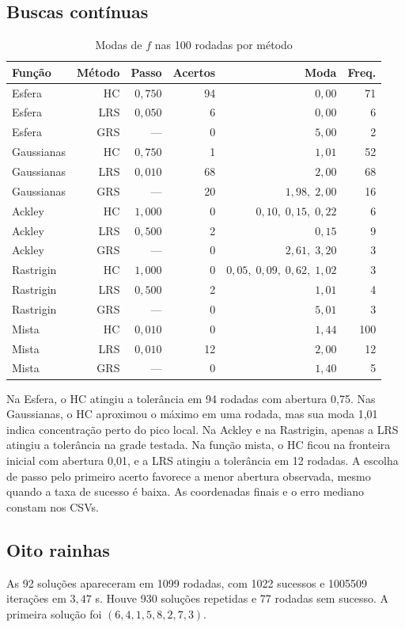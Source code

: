 \subsection{Buscas contínuas}
\begin{table}[!ht]\centering\caption{Modas de $f$ nas 100 rodadas por método}
\scriptsize\setlength{\tabcolsep}{4pt}\begin{tabular}{lrrrrr}\toprule
Função & Método & Passo & Acertos & Moda & Freq.\\
\midrule
Esfera & HC & $0{,}750$ & 94 & $0{,}00$ & 71\\
Esfera & LRS & $0{,}050$ & 6 & $0{,}00$ & 6\\
Esfera & GRS & --- & 0 & $5{,}00$ & 2\\
Gaussianas & HC & $0{,}750$ & 1 & $1{,}01$ & 52\\
Gaussianas & LRS & $0{,}010$ & 68 & $2{,}00$ & 68\\
Gaussianas & GRS & --- & 20 & $1{,}98,\;2{,}00$ & 16\\
Ackley & HC & $1{,}000$ & 0 & $0{,}10,\;0{,}15,\;0{,}22$ & 6\\
Ackley & LRS & $0{,}500$ & 2 & $0{,}15$ & 9\\
Ackley & GRS & --- & 0 & $2{,}61,\;3{,}20$ & 3\\
Rastrigin & HC & $1{,}000$ & 0 & $0{,}05,\;0{,}09,\;0{,}62,\;1{,}02$ & 3\\
Rastrigin & LRS & $0{,}500$ & 2 & $1{,}01$ & 4\\
Rastrigin & GRS & --- & 0 & $5{,}01$ & 3\\
Mista & HC & $0{,}010$ & 0 & $1{,}44$ & 100\\
Mista & LRS & $0{,}010$ & 12 & $2{,}00$ & 12\\
Mista & GRS & --- & 0 & $1{,}40$ & 5\\
\bottomrule\end{tabular}\end{table}
Na Esfera, o HC atingiu a tolerância em 94 rodadas com abertura 0,75. Nas Gaussianas, o HC aproximou o máximo em uma rodada, mas sua moda 1,01 indica concentração perto do pico local. Na Ackley e na Rastrigin, apenas a LRS atingiu a tolerância na grade testada. Na função mista, o HC ficou na fronteira inicial com abertura 0,01, e a LRS atingiu a tolerância em 12 rodadas. A escolha de passo pelo primeiro acerto favorece a menor abertura observada, mesmo quando a taxa de sucesso é baixa. As coordenadas finais e o erro mediano constam nos CSVs.
\subsection{Oito rainhas}
As 92 soluções apareceram em 1099 rodadas, com 1022 sucessos e 1005509 iterações em $3{,}47$ s. Houve 930 soluções repetidas e 77 rodadas sem sucesso. A primeira solução foi $(6, 4, 1, 5, 8, 2, 7, 3)$.
